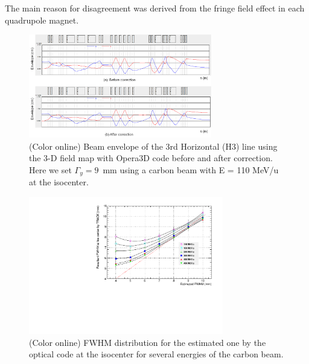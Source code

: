 \documentclass[jkps,preprint,fleqn,showpacs,showkeys]{revtex4}
\begin{document}
The main reason for disagreement was derived from the fringe field effect in each quadrupole magnet.
\begin{figure}[h]
  \begin{center}
    \includegraphics[width=8.0cm]{Fig06.png}    
    \caption{(Color online) Beam envelope of the 3rd Horizontal (H3) line using the 3-D field map with Opera3D code before and after correction.
      Here we set $\Gamma_{y} = 9$~mm using a carbon beam with E = 110 MeV/u at the isocenter.}
    \label{fig5}
  \end{center}
\end{figure}
\begin{figure}[h]
  \begin{center}
    \includegraphics[width=8.5cm]{Fig06-1.pdf}    
    \caption{(Color online) FWHM distribution for the estimated one by the optical code at the isocenter
      for several energies of the carbon beam.}
    \label{fig6}
  \end{center}
\end{figure}
\end{document}
